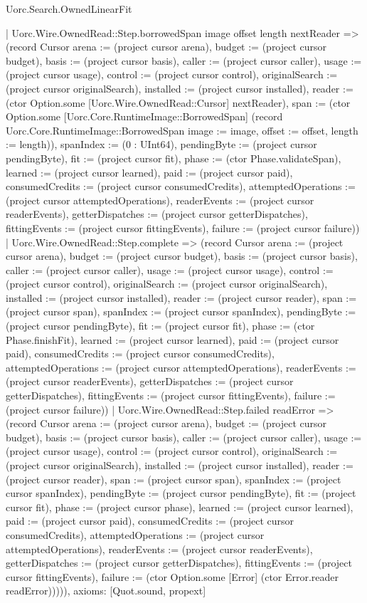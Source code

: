 \begin{lexlean}{Uorc.Search.OwnedLinearFit}
\begin{semanticmodule}
{      | Uorc.Wire.OwnedRead::Step.borrowedSpan image offset length nextReader => (record Cursor {arena := (project cursor arena), budget := (project cursor budget), basis := (project cursor basis), caller := (project cursor caller), usage := (project cursor usage), control := (project cursor control), originalSearch := (project cursor originalSearch), installed := (project cursor installed), reader := (ctor Option.some [Uorc.Wire.OwnedRead::Cursor] nextReader), span := (ctor Option.some [Uorc.Core.RuntimeImage::BorrowedSpan] (record Uorc.Core.RuntimeImage::BorrowedSpan {image := image, offset := offset, length := length})), spanIndex := (0 : UInt64), pendingByte := (project cursor pendingByte), fit := (project cursor fit), phase := (ctor Phase.validateSpan), learned := (project cursor learned), paid := (project cursor paid), consumedCredits := (project cursor consumedCredits), attemptedOperations := (project cursor attemptedOperations), readerEvents := (project cursor readerEvents), getterDispatches := (project cursor getterDispatches), fittingEvents := (project cursor fittingEvents), failure := (project cursor failure)})
      | Uorc.Wire.OwnedRead::Step.complete => (record Cursor {arena := (project cursor arena), budget := (project cursor budget), basis := (project cursor basis), caller := (project cursor caller), usage := (project cursor usage), control := (project cursor control), originalSearch := (project cursor originalSearch), installed := (project cursor installed), reader := (project cursor reader), span := (project cursor span), spanIndex := (project cursor spanIndex), pendingByte := (project cursor pendingByte), fit := (project cursor fit), phase := (ctor Phase.finishFit), learned := (project cursor learned), paid := (project cursor paid), consumedCredits := (project cursor consumedCredits), attemptedOperations := (project cursor attemptedOperations), readerEvents := (project cursor readerEvents), getterDispatches := (project cursor getterDispatches), fittingEvents := (project cursor fittingEvents), failure := (project cursor failure)})
      | Uorc.Wire.OwnedRead::Step.failed readError => (record Cursor {arena := (project cursor arena), budget := (project cursor budget), basis := (project cursor basis), caller := (project cursor caller), usage := (project cursor usage), control := (project cursor control), originalSearch := (project cursor originalSearch), installed := (project cursor installed), reader := (project cursor reader), span := (project cursor span), spanIndex := (project cursor spanIndex), pendingByte := (project cursor pendingByte), fit := (project cursor fit), phase := (project cursor phase), learned := (project cursor learned), paid := (project cursor paid), consumedCredits := (project cursor consumedCredits), attemptedOperations := (project cursor attemptedOperations), readerEvents := (project cursor readerEvents), getterDispatches := (project cursor getterDispatches), fittingEvents := (project cursor fittingEvents), failure := (ctor Option.some [Error] (ctor Error.reader readError))}))),
  axioms: [Quot.sound, propext]
}


\end{semanticmodule}
\end{lexlean}
